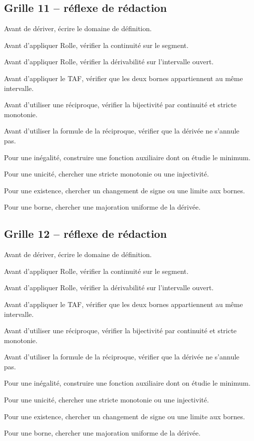 \documentclass[11pt,a4paper]{article}
\begin{document}
\subsection*{Grille 11 -- réflexe de rédaction}

\begin{methodebox}

Avant de dériver, écrire le domaine de définition.

Avant d'appliquer Rolle, vérifier la continuité sur le segment.

Avant d'appliquer Rolle, vérifier la dérivabilité sur l'intervalle ouvert.

Avant d'appliquer le TAF, vérifier que les deux bornes appartiennent au même intervalle.

Avant d'utiliser une réciproque, vérifier la bijectivité par continuité et stricte monotonie.

Avant d'utiliser la formule de la réciproque, vérifier que la dérivée ne s'annule pas.

Pour une inégalité, construire une fonction auxiliaire dont on étudie le minimum.

Pour une unicité, chercher une stricte monotonie ou une injectivité.

Pour une existence, chercher un changement de signe ou une limite aux bornes.

Pour une borne, chercher une majoration uniforme de la dérivée.

\end{methodebox}

\subsection*{Grille 12 -- réflexe de rédaction}

\begin{methodebox}

Avant de dériver, écrire le domaine de définition.

Avant d'appliquer Rolle, vérifier la continuité sur le segment.

Avant d'appliquer Rolle, vérifier la dérivabilité sur l'intervalle ouvert.

Avant d'appliquer le TAF, vérifier que les deux bornes appartiennent au même intervalle.

Avant d'utiliser une réciproque, vérifier la bijectivité par continuité et stricte monotonie.

Avant d'utiliser la formule de la réciproque, vérifier que la dérivée ne s'annule pas.

Pour une inégalité, construire une fonction auxiliaire dont on étudie le minimum.

Pour une unicité, chercher une stricte monotonie ou une injectivité.

Pour une existence, chercher un changement de signe ou une limite aux bornes.

Pour une borne, chercher une majoration uniforme de la dérivée.

\end{methodebox}
\end{document}
